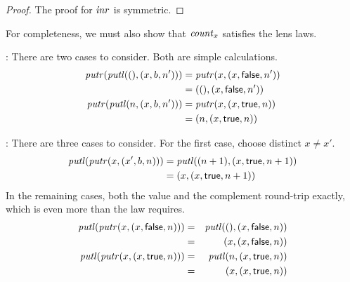 \begin{defn}[$R$-similarity]
\begin{theorem}
\begin{lemma}
\begin{theorem}[No products]
\begin{lemma}
\begin{proof}
The proof for $\mathit{inr}$ is symmetric. 
\end{proof}

\begin{goodlens}
For completeness, we must also show that $\mathit{count}_x$ satisfies the lens
laws.

\noindent{}: There are two cases to consider. Both are simple calculations.
\begin{align*}
    \mathit{putr}(\mathit{putl}({()},(x,b,n')))
        &= \mathit{putr}(x,(x,\mathsf{false},n')) \\
        &= ({()},(x,\mathsf{false},n')) \\
    \mathit{putr}(\mathit{putl}( n,(x,b,n')))
        &= \mathit{putr}(x,(x,\mathsf{true},n)) \\
        &= ( n,(x,\mathsf{true},n))
\end{align*}

\noindent{}: There are three cases to consider. For the first case,
choose distinct $x \ne x'$.
\begin{align*}
    \mathit{putl}(\mathit{putr}(x,(x',b,n)))
        &= \mathit{putl}((n+1),(x,\mathsf{true},n+1)) \\
        &= (x,(x,\mathsf{true},n+1))
\end{align*}
In the remaining cases, both the value and the complement round-trip
exactly, which is even more than the  law requires.
\begin{eqnarray*}
    \mathit{putl}(\mathit{putr}(x,(x,\mathsf{false},n)))
        &=& \mathit{putl}({()},(x,\mathsf{false},n)) \\
        &=& (x,(x,\mathsf{false},n)) \\
    \mathit{putl}(\mathit{putr}(x,(x,\mathsf{true},n)))
        &=& \mathit{putl}( n,(x,\mathsf{true},n)) \\
        &=& (x,(x,\mathsf{true},n)) 
\end{eqnarray*}
\end{goodlens}
\fi



\end{lemma}
\end{theorem}
\end{lemma}
\end{theorem}
\end{defn}
